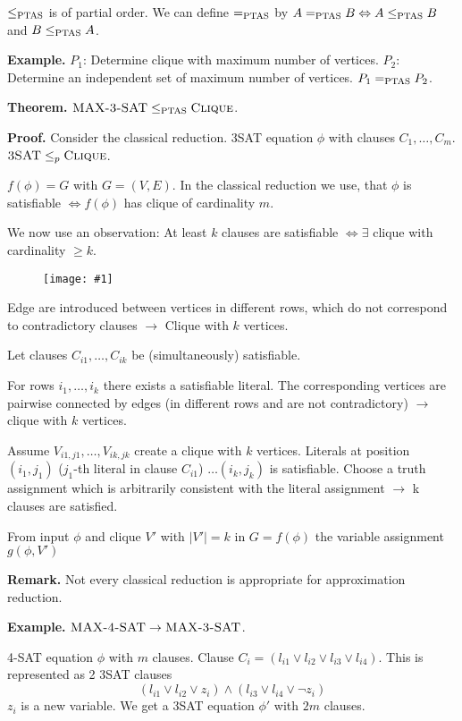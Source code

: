 \documentclass[a4paper]{article}
\newcommand{\drawing}[1]{%
 \begin{figure}[ht]
  \begin{center}
   \texttt{[image: \#1]}
  \end{center}
 \end{figure}
}
\newcommand{\cls}[1]{\rm{#1}}
\newcommand{\probl}[1]{\text{\textsc{#1}}}
\begin{document}
$\leq_{\cls{PTAS}}$ is of partial order.
We can define $=_{\cls{PTAS}}$ by $A =_{\cls{PTAS}} B \Leftrightarrow
A \leq_{\cls{PTAS}} B$ and $B \leq_{\cls{PTAS}} A$.

\textbf{Example.}
  $P_1$: Determine clique with maximum number of vertices.
  $P_2$: Determine an independent set of maximum number of vertices.
  $P_1 =_{\cls{PTAS}} P_2$.

\textbf{Theorem.}
  $\probl{MAX-3-SAT} \leq_{\cls{PTAS}} \probl{Clique}$.

\textbf{Proof.}
  Consider the classical reduction. 3SAT equation $\phi$
  with clauses $C_1, \ldots, C_m$. $\probl{3SAT} \leq_p \probl{Clique}$.

$f(\phi) = G$ with $G = (V, E)$. In the classical reduction we use,
that $\phi$ is satisfiable $\Leftrightarrow f(\phi)$ has clique of
cardinality $m$.

We now use an observation:
At least $k$ clauses are satisfiable $\Leftrightarrow \exists$ clique
with cardinality $\geq k$.

\drawing{literal_construction.pdf}

Edge are introduced between vertices in different rows, which
do not correspond to contradictory clauses $\rightarrow$ Clique with
$k$ vertices.

Let clauses $C_{i1}, \ldots, C_{ik}$ be (simultaneously) satisfiable.

For rows $i_1, \ldots, i_k$ there exists a satisfiable literal.
The corresponding vertices are pairwise connected by edges (in different
rows and are not contradictory) $\rightarrow$ clique with $k$ vertices.

Assume $V_{i1,j1}, \ldots, V_{ik,jk}$ create a clique with $k$ vertices.
Literals at position $(i_1, j_1)$ ($j_1$-th literal in clause $C_{i1}$)
$\ldots (i_k, j_k)$ is satisfiable.
Choose a truth assignment which is arbitrarily consistent with
the literal assignment $\rightarrow$ k clauses are satisfied.

From input $\phi$ and clique $V'$ with $|V'| = k$ in $G = f(\phi)$
the variable assignment $g(\phi, V')$ 

\textbf{Remark.}
  Not every classical reduction is appropriate for approximation reduction.

\textbf{Example.}
  $\probl{MAX-4-SAT} \rightarrow \probl{MAX-3-SAT}$.

4-SAT equation $\phi$ with $m$ clauses. Clause $C_i = (l_{i1} \lor l_{i2}
\lor l_{i3} \lor l_{i4})$. This is represented as 2 3SAT clauses
\[
  (l_{i1} \lor l_{i2} \lor z_{i}) \land (l_{i3} \lor l_{i4} \lor \neg z_i)
\]
$z_i$ is a new variable.
We get a 3SAT equation $\phi'$ with $2m$ clauses.
\end{document}
